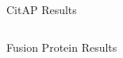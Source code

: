 \documentclass{beamer}
\begin{document}
\begin{frame}[t]
\begin{columns}[T,onlytextwidth]
\begin{column}{.48\linewidth}
{\begin{block}{CitAP Results}
\begin{columns}[t]
            \end{columns}  

        \end{block} 
 

%  
%
%        
%
%
%


        \vspace*{1.0ex}
  
        \vfill 

        \begin{block}{Fusion Protein Results}


\end{block}}
\end{column}
\end{columns}
\end{frame}
\end{document}
